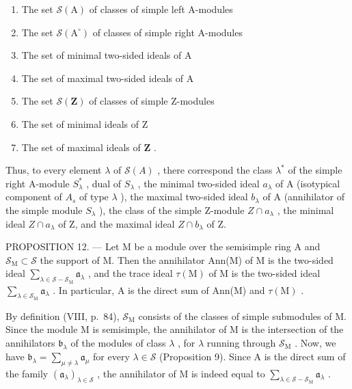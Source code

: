 \begin{enumerate}
\def\labelenumi{\alph{enumi})}
\item
  The set \(\mathcal{S}(\mathrm{A})\) of classes of simple left A-modules
\item
  The set \(\mathcal{S}(\mathrm{A}^{\circ})\) of classes of simple right A-modules
\item
  The set of minimal two-sided ideals of A
\item
  The set of maximal two-sided ideals of A
\item
  The set \(\mathcal{S}(\mathbf{Z})\) of classes of simple Z-modules
\item
  The set of minimal ideals of Z
\item
  The set of maximal ideals of \(\mathbf{Z}\) .
\end{enumerate}

Thus, to every element \(\lambda\) of \(\mathcal{S}(A)\) , there correspond the class \(\lambda^{*}\) of the simple right A-module \(S_{\lambda}^{*}\) , dual of \(S_{\lambda}\) , the minimal two-sided ideal \(a_{\lambda}\) of A (isotypical component of \(A_{s}\) of type \(\lambda\) ), the maximal two-sided ideal \(b_{\lambda}\) of A (annihilator of the simple module \(S_{\lambda}\) ), the class of the simple Z-module \(Z \cap a_{\lambda}\) , the minimal ideal \(Z \cap a_{\lambda}\) of Z, and the maximal ideal \(Z \cap b_{\lambda}\) of Z.

PROPOSITION 12. --- Let M be a module over the semisimple ring A and \(\mathcal{S}_{\mathrm{M}} \subset \mathcal{S}\) the support of M. Then the annihilator Ann(M) of M is the two-sided ideal \(\sum_{\lambda \in \mathcal{S} - \mathcal{S}_{\mathrm{M}}} \mathfrak{a}_{\lambda}\) , and the trace ideal \(\tau(\mathrm{M})\) of M is the two-sided ideal \(\sum_{\lambda \in \mathcal{S}_{\mathrm{M}}} \mathfrak{a}_{\lambda}\) . In particular, A is the direct sum of Ann(M) and \(\tau(\mathrm{M})\) .

By definition (VIII, p.~84), \(\mathcal{S}_{\mathrm{M}}\) consists of the classes of simple submodules of M. Since the module M is semisimple, the annihilator of M is the intersection of the annihilators \(\mathfrak{b}_{\lambda}\) of the modules of class \(\lambda\) , for \(\lambda\) running through \(\mathcal{S}_{\mathrm{M}}\) . Now, we have \(\mathfrak{b}_{\lambda} = \sum_{\mu \neq \lambda} \mathfrak{a}_{\mu}\) for every \(\lambda \in \mathcal{S}\) (Proposition 9). Since A is the direct sum of the family \((\mathfrak{a}_{\lambda})_{\lambda \in \mathcal{S}}\) , the annihilator of M is indeed equal to \(\sum_{\lambda \in \mathcal{S} - \mathcal{S}_{\mathrm{M}}} \mathfrak{a}_{\lambda}\) .

